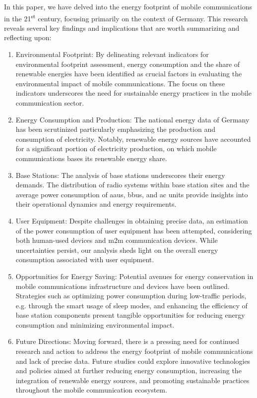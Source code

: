 \documentclass[11pt,a4paper]{article}
\begin{document}
In this paper, we have delved into the energy footprint of mobile communications in the 21\textsuperscript{st} century, focusing primarily on the context of Germany.
This research reveals several key findings and implications that are worth summarizing and reflecting upon:

\begin{enumerate}
  \item Environmental Footprint: By delineating relevant indicators for environmental footprint assessment, energy consumption and the share of renewable energies have been identified as crucial factors in evaluating the environmental impact of mobile communications.
  The focus on these indicators underscores the need for sustainable energy practices in the mobile communication sector.
  \item Energy Consumption and Production: The national energy data of Germany has been scrutinized  particularly emphasizing the production and consumption of electricity.
  Notably, renewable energy sources have accounted for a significant portion of electricity production, on which mobile communications bases its renewable energy share.
  \item Base Stations: The analysis of base stations underscores their energy demands.
  The distribution of radio systems within base station sites and the average power consumption of \acrshort{aau}s, \acrshort{bbu}s, and \acrshort{ac} units provide insights into their operational dynamics and energy requirements.
  \item User Equipment: Despite challenges in obtaining precise data, an estimation of the power consumption of user equipment has been attempted, considering both human-used devices and \acrshort{m2m} communication devices.
  While uncertainties persist, our analysis sheds light on the overall energy consumption associated with user equipment.
  \item Opportunities for Energy Saving: Potential avenues for energy conservation in mobile communications infrastructure and devices have been outlined.
  Strategies such as optimizing power consumption during low-traffic periods, e.g. through the smart usage of sleep modes, and enhancing the efficiency of base station components present tangible opportunities for reducing energy consumption and minimizing environmental impact.
  \item Future Directions: Moving forward, there is a pressing need for continued research and action to address the energy footprint of mobile communications and lack of precise data.
  Future studies could explore innovative technologies and policies aimed at further reducing energy consumption, increasing the integration of renewable energy sources, and promoting sustainable practices throughout the mobile communication ecosystem.
\end{enumerate}
\end{document}
